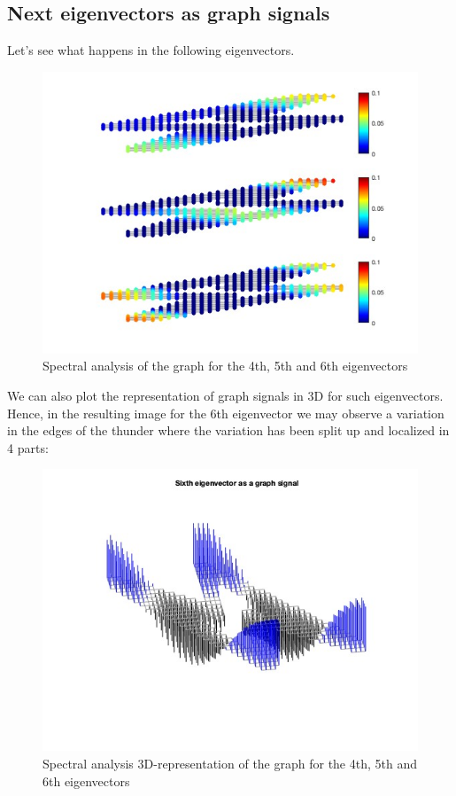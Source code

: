 \documentclass[12pt]{article}
\begin{document}
\subsection{Next eigenvectors as graph signals}
\justifying
Let's see what happens in the following eigenvectors.
\begin{figure}[H]
	\centering
	\includegraphics[width=12cm]{thunder_graph_2d_456ev.jpg}
	\caption{Spectral analysis of the graph for the 4th, 5th and 6th eigenvectors}
	\label{fig:Graphd2dSecondEV}
\end{figure}
\justifying
We can also plot the representation of graph signals in 3D for such eigenvectors. Hence, in the resulting image for the 6th eigenvector we may observe a variation in the edges of the thunder where the variation has been split up and localized in 4 parts:
\begin{figure}[H]
	\centering
	\includegraphics[width=12cm]{thunder_3d_456ev.jpg}
	\caption{Spectral analysis 3D-representation of the graph for the 4th, 5th and 6th eigenvectors}
	\label{fig:Graphd3dSecondEV}
\end{figure}
\end{document}
